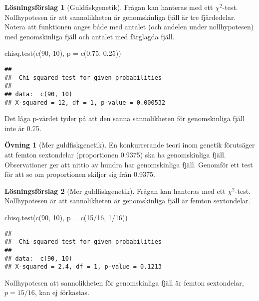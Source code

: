 \documentclass[
]{book}
\newenvironment{Shaded}{\begin{snugshade}}{\end{snugshade}}
\newcommand{\AttributeTok}[1]{\textcolor[rgb]{0.77,0.63,0.00}{#1}}
\newcommand{\DecValTok}[1]{\textcolor[rgb]{0.00,0.00,0.81}{#1}}
\newcommand{\FloatTok}[1]{\textcolor[rgb]{0.00,0.00,0.81}{#1}}
\newcommand{\FunctionTok}[1]{\textcolor[rgb]{0.00,0.00,0.00}{#1}}
\newcommand{\NormalTok}[1]{#1}
\newcommand{\SpecialCharTok}[1]{\textcolor[rgb]{0.00,0.00,0.00}{#1}}
\theoremstyle{definition}
\theoremstyle{definition}
\theoremstyle{definition}
\newtheorem{exercise}{Övning}[chapter]
\theoremstyle{definition}
\newtheorem{hypothesis}{Lösningsförslag}[chapter]
\theoremstyle{remark}
\begin{document}
\begin{hypothesis}[Guldfiskgenetik]
Frågan kan hanteras med ett \(\chi^2\)-test. Nollhypotesen är att sannolikheten är genomskinliga fjäll är tre fjärdedelar. Notera att funktionen anges både med antalet (och andelen under nollhypotesen) med genomskinliga fjäll och antalet med färglagda fjäll.

\begin{Shaded}
\begin{Highlighting}[]
\FunctionTok{chisq.test}\NormalTok{(}\FunctionTok{c}\NormalTok{(}\DecValTok{90}\NormalTok{, }\DecValTok{10}\NormalTok{), }\AttributeTok{p =} \FunctionTok{c}\NormalTok{(}\FloatTok{0.75}\NormalTok{, }\FloatTok{0.25}\NormalTok{))}
\end{Highlighting}
\end{Shaded}

\begin{verbatim}
## 
##  Chi-squared test for given probabilities
## 
## data:  c(90, 10)
## X-squared = 12, df = 1, p-value = 0.000532
\end{verbatim}

Det låga p-värdet tyder på att den sanna sannolikheten för genomskinliga fjäll inte är 0.75.
\end{hypothesis}

\begin{exercise}[Mer guldfiskgenetik]
En konkurrerande teori inom genetik förutsäger att femton sextondelar (proportionen 0.9375) ska ha genomskinliga fjäll. Observationer ger att nittio av hundra har genomskinliga fjäll. Genomför ett test för att se om proportionen skiljer sig från 0.9375.
\end{exercise}

\begin{hypothesis}[Mer guldfiskgenetik]
Frågan kan hanteras med ett \(\chi^2\)-test. Nollhypotesen är att sannolikheten är genomskinliga fjäll är femton sextondelar.

\begin{Shaded}
\begin{Highlighting}[]
\FunctionTok{chisq.test}\NormalTok{(}\FunctionTok{c}\NormalTok{(}\DecValTok{90}\NormalTok{, }\DecValTok{10}\NormalTok{), }\AttributeTok{p =} \FunctionTok{c}\NormalTok{(}\DecValTok{15}\SpecialCharTok{/}\DecValTok{16}\NormalTok{, }\DecValTok{1}\SpecialCharTok{/}\DecValTok{16}\NormalTok{))}
\end{Highlighting}
\end{Shaded}

\begin{verbatim}
## 
##  Chi-squared test for given probabilities
## 
## data:  c(90, 10)
## X-squared = 2.4, df = 1, p-value = 0.1213
\end{verbatim}

Nollhypotesen att sannolikheten för genomskinliga fjäll är femton sextondelar, \(p = 15/16\), kan ej förkastas.
\end{hypothesis}
\end{document}
